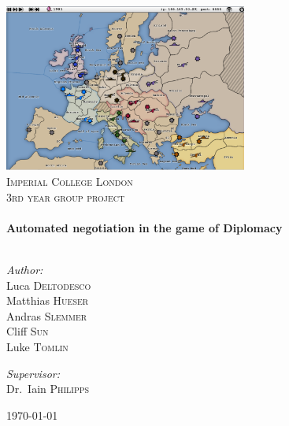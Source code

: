 \begin{titlepage}

\begin{center}

\includegraphics[width=0.60\textwidth]{./screenshots/StartMap.png}\\[1cm]    

\textsc{\LARGE Imperial College London}\\[1.5cm]

\textsc{\Large 3rd year group project}\\[0.5cm]

\HRule \\[0.4cm]
{ \huge \bfseries Automated negotiation in the game of Diplomacy}\\[0.4cm]

\HRule \\[1.5cm]

\begin{minipage}{0.4\textwidth}
\begin{flushleft} \large
\emph{Author:}\\
Luca \textsc{Deltodesco} \\
Matthias \textsc{Hueser} \\
Andras \textsc{Slemmer} \\
Cliff \textsc{Sun} \\
Luke \textsc{Tomlin} \\
\end{flushleft}
\end{minipage}
\begin{minipage}{0.4\textwidth}
\begin{flushright} \large
\emph{Supervisor:} \\
Dr.~Iain \textsc{Philipps}
\end{flushright}
\end{minipage}

\vfill

{\large \today}

\end{center}

\end{titlepage}

